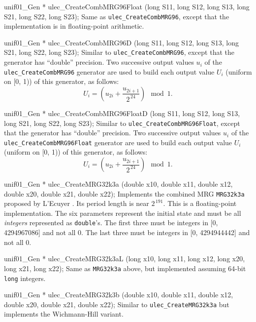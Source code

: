 unif01_Gen * ulec_CreateCombMRG96Float (long S11, long S12, long S13,
                                        long S21, long S22, long S23);
\endcode
 \tab  Same as {\tt ulec\_CreateCombMRG96}, except that the implementation
  is in floating-point arithmetic.
 \endtab
\code


unif01_Gen * ulec_CreateCombMRG96D (long S11, long S12, long S13,
                                    long S21, long S22, long S23);
\endcode
 \tab   Similar to  {\tt ulec\_CreateCombMRG96}, except that the
   generator has ``double'' precision.   Two successive output values
   $u_i$ of the  {\tt ulec\_CreateCombMRG96} generator are used to build each
   output value $U_i$ (uniform on [0, 1)) of this generator, as follows:
  $$
   U_{i} = \left(u_{2i} + \frac{u_{2i+1}}{2^{\,24}}\right) \mod 1.
  $$
 \endtab
\code


unif01_Gen * ulec_CreateCombMRG96FloatD (long S11, long S12, long S13,
                                         long S21, long S22, long S23);
\endcode
 \tab   Similar to  {\tt ulec\_CreateCombMRG96Float}, except that the
   generator has ``double'' precision.   Two successive output values
   $u_i$ of the  {\tt ulec\_CreateCombMRG96Float} generator are used
   to build each
   output value $U_i$ (uniform on [0, 1)) of this generator, as follows:
  $$
   U_{i} = \left(u_{2i} + \frac{u_{2i+1}}{2^{\,24}}\right) \mod 1.
  $$
 \endtab
\code


unif01_Gen * ulec_CreateMRG32k3a (double x10, double x11, double x12,
                                  double x20, double x21, double x22);
\endcode
 \tab  Implements the combined MRG {\tt MRG32k3a}
  proposed by L'Ecuyer \cite{rLEC99b}.
%
  Its period length is near $2^{\,191}$.
  This is a floating-point implementation.
  The six parameters represent the initial state and must be all
  {\em integers\/} represented as {\tt double}'s. The first three must
  be integers in [0, 4294967086] and not all 0. The last three must
  be integers in [0, 4294944442] and not all 0.
 \endtab
\code


unif01_Gen * ulec_CreateMRG32k3aL (long x10, long x11, long x12,
                                   long x20, long x21, long x22);
\endcode
 \tab Same as {\tt MRG32k3a} above,
  but implemented assuming 64-bit {\tt long} integers.
%
 \endtab
\code


unif01_Gen * ulec_CreateMRG32k3b (double x10, double x11, double x12,
                                  double x20, double x21, double x22);
\endcode
 \tab Similar to {\tt ulec\_CreateMRG32k3a} but implements
%
   the Wichmann-Hill variant.
 \endtab
\code


